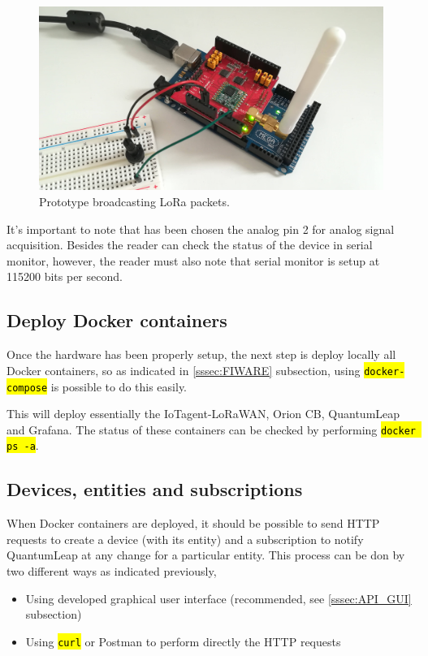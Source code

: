 \documentclass[11pt,a4paper,dvipsnames,twoside]{article}
\newcommand{\cmd}[1] {\hl{\texttt{#1}}}
\begin{document}
\begin{figure}[ht]
  \centering
  \includegraphics[width=.9\textwidth]{../pictures/prototype.jpg}
  \caption{Prototype broadcasting LoRa packets.}
  \label{fig:prototype}
\end{figure}

It's important to note that has been chosen the analog pin 2 for analog signal acquisition. Besides the reader can check the status of the device in serial monitor, however, the reader must also note that serial monitor is setup at 115200 bits per second.

\subsection{Deploy Docker containers}
Once the hardware has been properly setup, the next step is deploy locally all Docker containers, so as indicated in \ref{sssec:FIWARE} subsection, using \cmd{docker-compose} is possible to do this easily. 

This will deploy essentially the IoTagent-LoRaWAN, Orion CB, QuantumLeap and Grafana. The status of these containers can be checked by performing \cmd{docker ps -a}.

\subsection{Devices, entities and subscriptions}
When Docker containers are deployed, it should be possible to send HTTP requests to create a device (with its entity) and a subscription to notify QuantumLeap at any change for a particular entity. This process can be don by two different ways as indicated previously, 

\begin{itemize}
  \item Using developed graphical user interface (recommended, see \ref{sssec:API_GUI} subsection)
  \item Using \cmd{curl} or Postman to perform directly the HTTP requests
\end{itemize}
\end{document}
